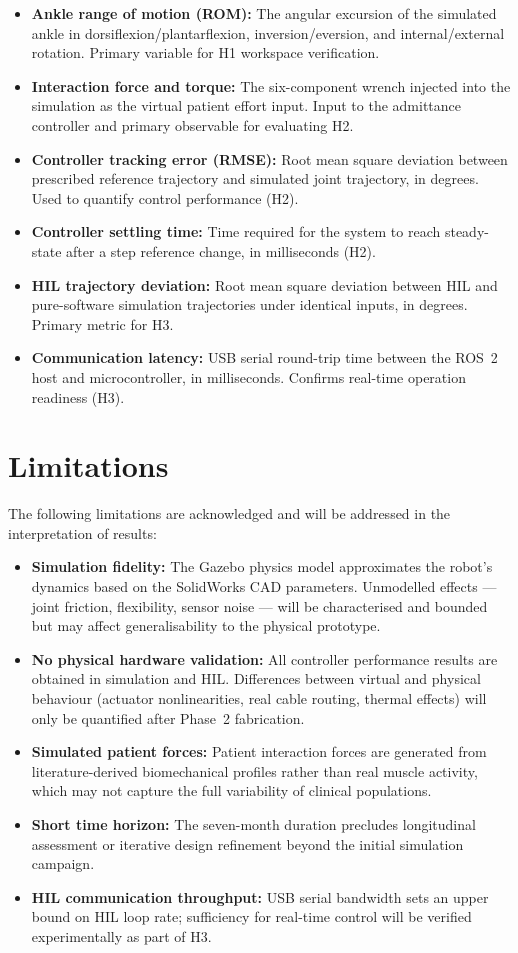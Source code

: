 \begin{itemize}
    \item \textbf{Ankle range of motion (ROM):} The angular excursion of the simulated ankle in dorsiflexion/plantarflexion, inversion/eversion, and internal/external rotation. Primary variable for H1 workspace verification.
    \item \textbf{Interaction force and torque:} The six-component wrench injected into the simulation as the virtual patient effort input. Input to the admittance controller and primary observable for evaluating H2.
    \item \textbf{Controller tracking error (RMSE):} Root mean square deviation between prescribed reference trajectory and simulated joint trajectory, in degrees. Used to quantify control performance (H2).
    \item \textbf{Controller settling time:} Time required for the system to reach steady-state after a step reference change, in milliseconds (H2).
    \item \textbf{HIL trajectory deviation:} Root mean square deviation between HIL and pure-software simulation trajectories under identical inputs, in degrees. Primary metric for H3.
    \item \textbf{Communication latency:} USB serial round-trip time between the ROS~2 host and microcontroller, in milliseconds. Confirms real-time operation readiness (H3).
\end{itemize}

\section{Limitations}

The following limitations are acknowledged and will be addressed in the interpretation of results:

\begin{itemize}
    \item \textbf{Simulation fidelity:} The Gazebo physics model approximates the robot's dynamics based on the SolidWorks CAD parameters. Unmodelled effects — joint friction, flexibility, sensor noise — will be characterised and bounded but may affect generalisability to the physical prototype.
    \item \textbf{No physical hardware validation:} All controller performance results are obtained in simulation and HIL. Differences between virtual and physical behaviour (actuator nonlinearities, real cable routing, thermal effects) will only be quantified after Phase~2 fabrication.
    \item \textbf{Simulated patient forces:} Patient interaction forces are generated from literature-derived biomechanical profiles rather than real muscle activity, which may not capture the full variability of clinical populations.
    \item \textbf{Short time horizon:} The seven-month duration precludes longitudinal assessment or iterative design refinement beyond the initial simulation campaign.
    \item \textbf{HIL communication throughput:} USB serial bandwidth sets an upper bound on HIL loop rate; sufficiency for real-time control will be verified experimentally as part of H3.
\end{itemize}
